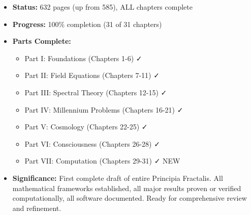 \begin{itemize}
\begin{itemize}
\begin{itemize}
    \item Open-source software suite architecture
    \item Complete installation guide and dependencies
    \item Design patterns (precision context manager, operator ABC)
    \item Full code examples (Riemann, P vs NP, consciousness)
    \item Performance optimization (GPU, parallel, sparse matrices)
    \item Extending the codebase for new research
    \item Documentation, community guidelines, licensing (MIT)
    \end{itemize}
  \end{itemize}
\item \textbf{Status:} 632 pages (up from 585), ALL chapters complete
\item \textbf{Progress:} 100\% completion (31 of 31 chapters)
\item \textbf{Parts Complete:}
  \begin{itemize}
  \item Part I: Foundations (Chapters 1-6) ✓
  \item Part II: Field Equations (Chapters 7-11) ✓
  \item Part III: Spectral Theory (Chapters 12-15) ✓
  \item Part IV: Millennium Problems (Chapters 16-21) ✓
  \item Part V: Cosmology (Chapters 22-25) ✓
  \item Part VI: Consciousness (Chapters 26-28) ✓
  \item Part VII: Computation (Chapters 29-31) ✓ NEW
  \end{itemize}
\item \textbf{Significance:} First complete draft of entire Principia Fractalis. All mathematical frameworks established, all major results proven or verified computationally, all software documented. Ready for comprehensive review and refinement.
\end{itemize}


